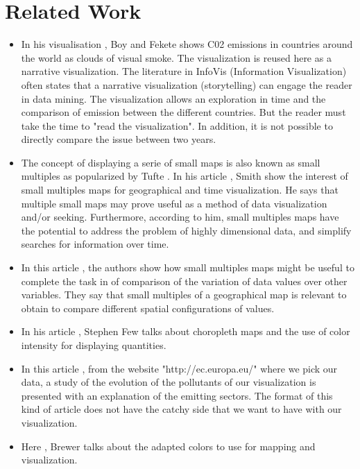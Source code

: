 \documentclass[preprint,journal]{vgtc}       %
\begin{document}
\section{Related Work}

\begin{itemize}
\item In his visualisation \cite{Boy:2014:TCP}, Boy and Fekete shows C02 emissions in countries around the world as clouds of visual smoke. The visualization is reused here \cite{Mediapart:2014:CPM} as a narrative visualization. The literature in InfoVis (Information Visualization) often states that a narrative visualization (storytelling) can engage the reader in data mining. The visualization allows an exploration in time and the comparison of emission between the different countries. But the reader must take the time to "read the visualization". In addition, it is not possible to directly compare the issue between two years.

\item The concept of displaying a serie of small maps is also known as small multiples as popularized by Tufte \cite{Tufte:1983:VDQ}. In his article \cite{Smith:2005:MSM}, Smith show the interest of small multiples maps for geographical and time visualization. He says that multiple small maps may prove useful as a method of data visualization and/or seeking. Furthermore, according to him, small multiples maps have the potential to address the problem of highly dimensional data, and simplify searches for information over time.

\item In this article \cite{Reimer:2011:SSM}, the authors show how small multiples maps might be useful to complete the task in of comparison of the variation of data values over other variables. They say that small multiples of a geographical map is relevant to obtain to compare different spatial configurations of values.

\item In his article \cite{Few:2009:GDV}, Stephen Few talks about choropleth maps and the use of color intensity for displaying quantities.

\item In this article \cite{Eurostats:2016:VMC}, from the website "http://ec.europa.eu/" where we pick our data, a study of the evolution of the pollutants of our visualization is presented with an explanation of the emitting sectors. The format of this kind of article does not have the catchy side that we want to have with our visualization.

\item Here \cite{Brewer:1994:CUG} , Brewer talks about the adapted colors to use for mapping and visualization.


\end{itemize}
\end{document}
